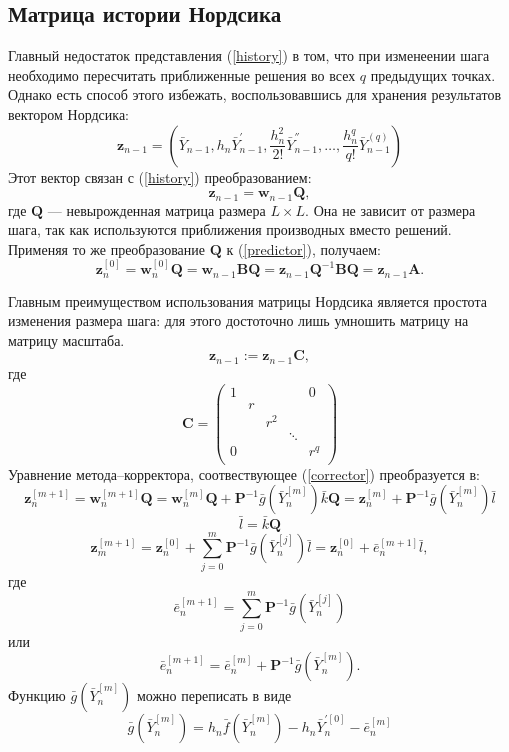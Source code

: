 \documentclass[oneside,final,14pt]{extreport}
\begin{document}
\subsection{Матрица истории Нордсика}
Главный недостаток представления (\ref{history}) в том, что при изменеении шага необходимо пересчитать приближенные решения во всех \(q\) предыдущих точках. Однако есть способ этого избежать, воспользовавшись для хранения результатов вектором Нордсика:
\[\mathbf z_{n-1}=\left(\bar Y_{n-1},h_n\bar Y_{n-1}^{'}, \frac{h_n^2}{2!}\bar Y_{n-1}^{''},\ldots,\frac{h_n^q}{q!}\bar Y_{n-1}^{(q)}\right)\]
Этот вектор связан с (\ref{history}) преобразованием:
\[\mathbf z_{n-1}=\mathbf w_{n-1} \mathbf Q,\]
где \(\mathbf Q\) --- невырожденная матрица размера \(L \times L\). Она не зависит от размера шага, так как используются приближения производных вместо решений. Применяя то же преобразование \(\mathbf Q\) к (\ref{predictor}), получаем:
\[
\mathbf z_n^{[0]}=\mathbf w_n^{[0]}\mathbf Q=\mathbf w_{n-1}\mathbf{B Q}=\mathbf z_{n-1}\mathbf Q^{-1}\mathbf{B Q}=\mathbf z_{n-1}\mathbf A
.\]

Главным преимуществом использования матрицы Нордсика является простота изменения размера шага: для этого достоточно лишь умношить матрицу на матрицу масштаба.
\[\mathbf z_{n-1}:=\mathbf z_{n-1} \mathbf C,\]
где
\[\mathbf C=
\begin{pmatrix}
	1 &   & & & 0\\
	  & r & & &\\
	  &   & r^2 & &\\
	  &   &  & \ddots &\\
	0 &   &  &  & r^q\\
\end{pmatrix}
\]
Уравнение метода--корректора, соотвествующее (\ref{corrector}) преобразуется в:
\[
\mathbf z_n^{[m+1]}=\mathbf w_n^{[m+1]}\mathbf Q=\mathbf w_n^{[m]}\mathbf Q+\mathbf P^{-1}\bar g(\bar Y_n^{[m]})\bar k\mathbf Q=\mathbf z_{n}^{[m]}+\mathbf P^{-1}\bar g(\bar Y_n^{[m]})\bar l
\]
\[
\bar l=\bar k\mathbf Q
\]
\begin{equation}
\label{nordseick:iteration}
\mathbf z_m^{[m+1]}=\mathbf z_n^{[0]}+\sum_{j=0}^m\mathbf P^{-1}\bar g(\bar Y_n^{[j]})\bar l=\mathbf z_n^{[0]}+\bar e_n^{[m+1]}\bar l
,\end{equation}
где
\[\bar e_n^{[m+1]}=\sum_{j=0}^m\mathbf P^{-1}\bar g(\bar Y_n^{[j]})\]
или
\[\bar e_n^{[m+1]}=\bar e_n^{[m]}+\mathbf P^{-1}\bar g(\bar Y_n^{[m]}).\]
Функцию \(\bar g(\bar Y_n^{[m]})\) можно переписать в виде
\[\bar g(\bar Y_n^{[m]})=h_n\bar f(\bar Y_n^{[m]})-h_n\bar Y_n^{'[0]}-\bar e_n^{[m]}\]
\end{document}

